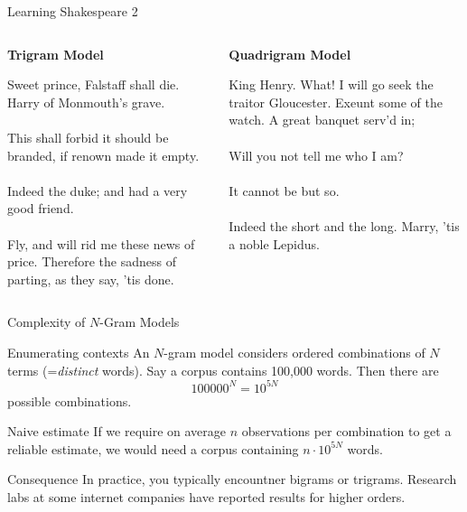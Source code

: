 \documentclass[dvipsnames,mathserif]{beamer}
\newcommand{\footlineextra}[1]{\gdef\insertfootlineextra{#1}}
\def\lsep{\\ \mbox{ } \\}
\begin{document}
{\begin{frame}{Learning Shakespeare 2}
  \begin{columns}[t]
    \begin{column}{0.5\textwidth}
      \vspace{-1cm}
      \begin{center}
        \textbf{Trigram Model}
      \end{center}
      Sweet prince, Falstaff shall die. Harry of Monmouth's grave. 
      \lsep
      This shall forbid it should be branded, if renown made it empty. 
      \lsep
      Indeed the duke; and had a very good friend. 
      \lsep
      Fly, and will rid me these news of price. Therefore the sadness of
      parting, as they say, 'tis done.
    \end{column}
    \begin{column}{0.5\textwidth}
      \vspace{-1cm}
      \begin{center}
        \textbf{Quadrigram Model}
      \end{center}
      King Henry. What! I will go seek the traitor Gloucester. Exeunt some
      of the watch. A great banquet serv'd in; 
      \lsep
      Will you not tell me who I am? 
      \lsep
      It cannot be but so.
      \lsep
      Indeed the short and the long. Marry, 'tis a noble Lepidus.
    \end{column}
  \end{columns}
 \footlineextra{From Jurafsky and Martin, "Speech and Language
   Processing", 2009.}
\end{frame}

\begin{frame}{Complexity of $N$-Gram Models}
  \begin{block}{Enumerating contexts}
    An $N$-gram model considers ordered combinations of $N$ terms
    (=\emph{distinct} words).
    Say a corpus contains 100,000 words. Then there are
    \begin{equation*}
      100000^N = 10^{5N}
    \end{equation*}
    possible combinations. 
  \end{block}
  \begin{block}{Naive estimate}
    If we require on average $n$ observations per combination to get a
    reliable estimate, we would need a corpus containing $n\cdot
    10^{5N}$ words.
  \end{block}
  \begin{block}{Consequence}
    In practice, you typically encountner bigrams or
    trigrams. Research labs at some internet companies have
    reported results for higher orders.
  \end{block}
\end{frame}

}
\end{document}

